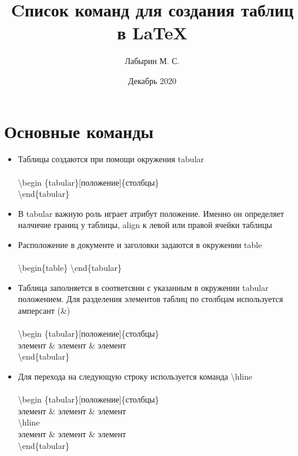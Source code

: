 \documentclass[a4paper,12pt]{article} %
\author{Лабырин М. С.}
\title{Cписок команд для создания таблиц в \LaTeX{}}
\date{Декабрь 2020}
\begin{document}

\maketitle
\newpage

\section{Основные команды}

\begin{itemize}
    \item Таблицы создаются при помощи окружения tabular\\\\
    \textbackslash begin \{tabular\}[положение]\{столбцы\}\\ \textbackslash end\{tabular\}
    \item В tabular важную роль играет атрибут положение. Именно он определяет налчичие границ у таблицы, align к левой или правой ячейки таблицы
    \item Расположение в документе и заголовки задаются в окружении table\\\\
    \textbackslash begin\{table\} \textbackslash end\{tabular\}
    \item Таблица заполняется в соответсвии с указанным в окружении tabular положением. Для разделения элементов таблиц по столбцам используется амперсант (\&)\\\\
    \textbackslash begin \{tabular\}[положение]\{столбцы\}\\
    элемент \& элемент \& элемент\\
    \textbackslash end\{tabular\}
    \item Для перехода на следующую строку используется команда \textbackslash hline \\\\
    \textbackslash begin \{tabular\}[положение]\{столбцы\}\\
    элемент \& элемент \& элемент\\
    \textbackslash hline\\
    элемент \& элемент \& элемент\\
    \textbackslash end\{tabular\}
    
\end{itemize}
\end{document}

